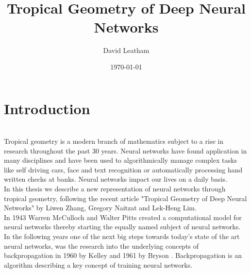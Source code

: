 \documentclass{article}
\title{Tropical Geometry of Deep Neural Networks}
\author{David Leatham}
\date{\today}
\theoremstyle{definition}
\begin{document}


\newpage
  
\tableofcontents

\newpage


\section{Introduction} 
\leavevmode
\\
Tropical geometry is a modern branch of mathematics subject to a rise in research throughout the past 30 years. Neural networks have found application in many disciplines and have been used to algorithmically manage complex tasks like self driving cars, face and text recognition or automatically processing hand written checks at banks. Neural networks impact our lives on a daily basis. \\
In this thesis we describe a new representation of neural networks through tropical geometry, following the recent article "Tropical Geometry of Deep Neural Networks" by Liwen Zhang, Gregory Naitzat and Lek-Heng Lim. \\

In 1943 Warren McCulloch and Walter Pitts created a computational model for neural networks thereby starting the equally named subject of neural networks\cite{mcculloch1943logical}. In the following years one of the next big steps towards today's state of the art neural networks, was the research into the underlying concepts of backpropagation in 1960 by Kelley \cite{kelley1960gradient} and 1961 by Bryson \cite{bryson1961gradient}. Backpropagation is an algorithm describing a key concept of training neural networks. 
\end{document}
